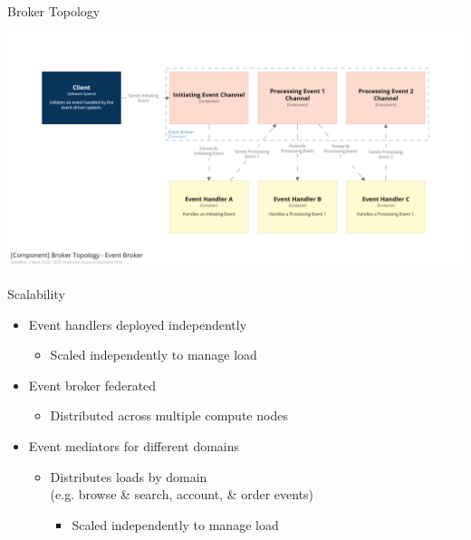 \documentclass{slide}
\begin{document}
\begin{frame}{Broker Topology}
    \begin{adjustwidth}{-10mm}{-10mm}
        \centering
        \includegraphics[trim=195 195 195 195,clip,width=0.97\paperwidth]{../../notes/event/diagrams/broker-components.png}
    \end{adjustwidth}
\end{frame}

\begin{frame}{Scalability}
    \vspace{1mm}
    {\LARGE
    \begin{itemize}
        \item Event handlers deployed independently
        \begin{itemize}
            \Large\item Scaled independently to manage load
	\end{itemize}
        \vspace{3mm}
        \item Event broker federated
        \begin{itemize}
            \Large\item Distributed across multiple compute nodes
	\end{itemize}
        \vspace{3mm}
        \item Event mediators for different domains
        \begin{itemize}
            \Large\item Distributes loads by domain\\(e.g. browse \& search, account, \& order events)
            \begin{itemize}
                \item Scaled independently to manage load
            \end{itemize}
	\end{itemize}
    \end{itemize}
    }
\end{frame}
\end{document}
